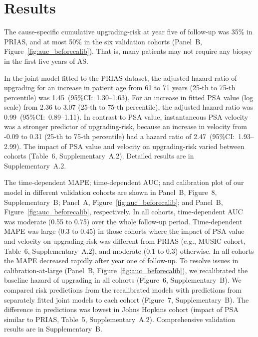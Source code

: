 \section{Results}
The cause-specific cumulative upgrading-risk at year five of follow-up was 35\% in PRIAS, and at most 50\% in the six validation cohorts (Panel~B, Figure~\ref{fig:auc_beforecalib}). That is, many patients may not require any biopsy in the first five years of AS.

In the joint model fitted to the PRIAS dataset, the adjusted hazard ratio of upgrading for an increase in patient age from 61 to 71 years (25-th to 75-th percentile) was 1.45~(95\%CI:~1.30--1.63). For an increase in fitted PSA value (log scale) from 2.36 to 3.07 (25-th to 75-th percentile), the adjusted hazard ratio was 0.99~(95\%CI:~0.89--1.11). In contrast to PSA value, instantaneous PSA velocity was a stronger predictor of upgrading-risk, because an increase in velocity from -0.09 to 0.31 (25-th to 75-th percentile) had a hazard ratio of 2.47~(95\%CI:~1.93--2.99). The impact of PSA value and velocity on upgrading-risk varied between cohorts (Table~6, Supplementary~A.2). Detailed results are in Supplementary~A.2.

The time-dependent MAPE; time-dependent AUC; and calibration plot of our model in different validation cohorts are shown in Panel~B, Figure~8, Supplementary~B; Panel~A, Figure~\ref{fig:auc_beforecalib}; and Panel~B, Figure~\ref{fig:auc_beforecalib}, respectively. In all cohorts, time-dependent AUC was moderate (0.55 to 0.75) over the whole follow-up period. Time-dependent MAPE was large (0.3 to 0.45) in those cohorts where the impact of PSA value and velocity on upgrading-risk was different from PRIAS (e.g., MUSIC cohort, Table~6, Supplementary~A.2), and moderate (0.1 to 0.3) otherwise. In all cohorts the MAPE decreased rapidly after year one of follow-up. To resolve issues in calibration-at-large (Panel~B, Figure~\ref{fig:auc_beforecalib}), we recalibrated the baseline hazard of upgrading in all cohorts (Figure~6, Supplementary~B). We compared risk predictions from the recalibrated models with predictions from separately fitted joint models to each cohort (Figure~7, Supplementary~B). The difference in predictions was lowest in Johns Hopkins cohort (impact of PSA similar to PRIAS, Table~5, Supplementary~A.2). Comprehensive validation results are in Supplementary~B.

